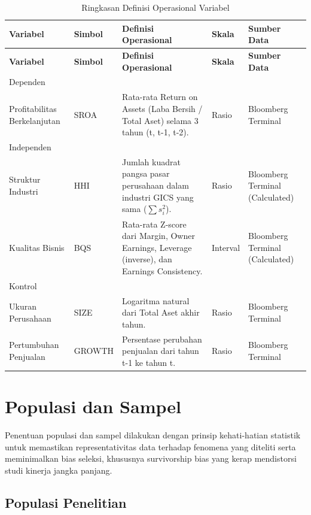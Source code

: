 \documentclass[12pt,a4paper]{report}
\begin{document}
\begin{longtable}{>{\raggedright\arraybackslash}p{} >{\raggedright\arraybackslash}p{} >{\raggedright\arraybackslash}p{} >{\raggedright\arraybackslash}p{} >{\raggedright\arraybackslash}p{}}
\caption{Ringkasan Definisi Operasional Variabel}\label{tab:definisi-operasional}\\
\toprule
\textbf{Variabel} & \textbf{Simbol} & \textbf{Definisi Operasional} & \textbf{Skala} & \textbf{Sumber Data} \\
\midrule
\endfirsthead
\toprule
\textbf{Variabel} & \textbf{Simbol} & \textbf{Definisi Operasional} & \textbf{Skala} & \textbf{Sumber Data} \\
\midrule
\endhead
Dependen & & & & \\
Profitabilitas Berkelanjutan & SROA & Rata-rata Return on Assets (Laba Bersih / Total Aset) selama 3 tahun (t, t-1, t-2). & Rasio & Bloomberg Terminal \\
Independen & & & & \\
Struktur Industri & HHI & Jumlah kuadrat pangsa pasar perusahaan dalam industri GICS yang sama ($\sum s_i^2$). & Rasio & Bloomberg Terminal (Calculated) \\
Kualitas Bisnis & BQS & Rata-rata Z-score dari Margin, Owner Earnings, Leverage (inverse), dan Earnings Consistency. & Interval & Bloomberg Terminal (Calculated) \\
Kontrol & & & & \\
Ukuran Perusahaan & SIZE & Logaritma natural dari Total Aset akhir tahun. & Rasio & Bloomberg Terminal \\
Pertumbuhan Penjualan & GROWTH & Persentase perubahan penjualan dari tahun t-1 ke tahun t. & Rasio & Bloomberg Terminal \\
\bottomrule
\end{longtable}

\hypertarget{populasi-dan-sampel}{%
\section{Populasi dan Sampel}\label{populasi-dan-sampel}}

Penentuan populasi dan sampel dilakukan dengan prinsip kehati-hatian
statistik untuk memastikan representativitas data terhadap fenomena yang
diteliti serta meminimalkan bias seleksi, khususnya survivorship bias
yang kerap mendistorsi studi kinerja jangka panjang.

\hypertarget{populasi-penelitian}{%
\subsection{Populasi Penelitian}\label{populasi-penelitian}}
\end{document}
